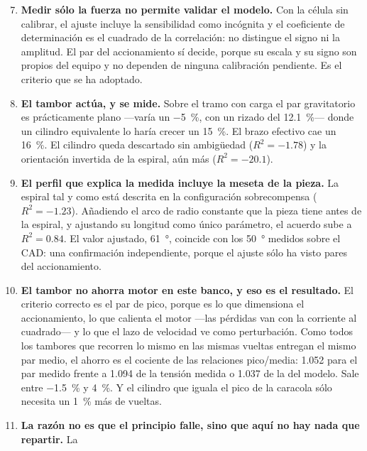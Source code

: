 \begin{enumerate}\setcounter{enumi}{6}
  \item \textbf{Medir sólo la fuerza no permite validar el modelo.} Con la célula sin calibrar, el
        ajuste incluye la sensibilidad como incógnita y el coeficiente de determinación es el
        cuadrado de la correlación: no distingue el signo ni la amplitud. El par del accionamiento
        sí decide, porque su escala y su signo son propios del equipo y no dependen de ninguna
        calibración pendiente. Es el criterio que se ha adoptado.
  \item \textbf{El tambor actúa, y se mide.} Sobre el tramo con carga el par gravitatorio es
        prácticamente plano ---varía un \SI{-5}{\percent}, con un rizado del \SI{12.1}{\percent}---
        donde un cilindro equivalente lo haría crecer un \SI{15}{\percent}. El brazo efectivo cae un
        \SI{16}{\percent}. El cilindro queda descartado sin ambigüedad ($R^2 = \num{-1.78}$) y la
        orientación invertida de la espiral, aún más ($R^2 = \num{-20.1}$).
  \item \textbf{El perfil que explica la medida incluye la meseta de la pieza.} La espiral tal y
        como está descrita en la configuración sobrecompensa ($R^2 = \num{-1.23}$). Añadiendo el
        arco de radio constante que la pieza tiene antes de la espiral, y ajustando su longitud como
        único parámetro, el acuerdo sube a $R^2 = \num{0.84}$. El valor ajustado, \SI{61}{\degree},
        coincide con los \SI{50}{\degree} medidos sobre el CAD: una confirmación independiente,
        porque el ajuste sólo ha visto pares del accionamiento.
  \item \textbf{El tambor no ahorra motor en este banco, y eso es el resultado.} El criterio
        correcto es el par de pico, porque es lo que dimensiona el accionamiento, lo que calienta el
        motor ---las pérdidas van con la corriente al cuadrado--- y lo que el lazo de velocidad ve
        como perturbación. Como todos los tambores que recorren lo mismo en las mismas vueltas
        entregan el mismo par medio, el ahorro es el cociente de las relaciones pico/media:
        \num{1.052} para el par medido frente a \num{1.094} de la tensión medida o \num{1.037} de
        la del modelo. Sale entre \SI{-1.5}{\percent} y \SI{+4}{\percent}. Y el cilindro que
        iguala el pico de la caracola sólo necesita un \SI{1}{\percent} más de vueltas.
  \item \textbf{La razón no es que el principio falle, sino que aquí no hay nada que repartir.} La

\end{enumerate}
